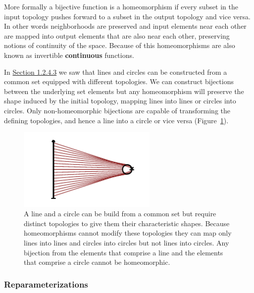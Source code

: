 \documentclass[
  letterpaper,
  DIV=11,
  numbers=noendperiod]{scrartcl}
\begin{document}
More formally a bijective function is a homeomorphism if every subset in
the input topology pushes forward to a subset in the output topology and
vice versa. In other words neighborhoods are preserved and input
elements near each other are mapped into output elements that are also
near each other, preserving notions of continuity of the space. Because
of this homeomorphisms are also known as invertible \textbf{continuous}
functions.

In \href{@sec:general-topology}{Section 1.2.4.3} we saw that lines and
circles can be constructed from a common set equipped with different
topologies. We can construct bijections between the underlying set
elements but any homeomorphism will preserve the shape induced by the
initial topology, mapping lines into lines or circles into circles. Only
non-homeomorphic bijections are capable of transforming the defining
topologies, and hence a line into a circle or vice versa
(Figure~\ref{fig-non-homeomorphism}).

\begin{figure}

{\centering \includegraphics[width=0.6\textwidth,height=\textheight]{figures/maps/non_homeomorphism/non_homeomorphism.pdf}

}

\caption{\label{fig-non-homeomorphism}A line and a circle can be build
from a common set but require distinct topologies to give them their
characteristic shapes. Because homeomorphisms cannot modify these
topologies they can map only lines into lines and circles into circles
but not lines into circles. Any bijection from the elements that
comprise a line and the elements that comprise a circle cannot be
homeomorphic.}

\end{figure}

\hypertarget{reparameterizations}{%
\subsubsection{Reparameterizations}\label{reparameterizations}}
\end{document}
